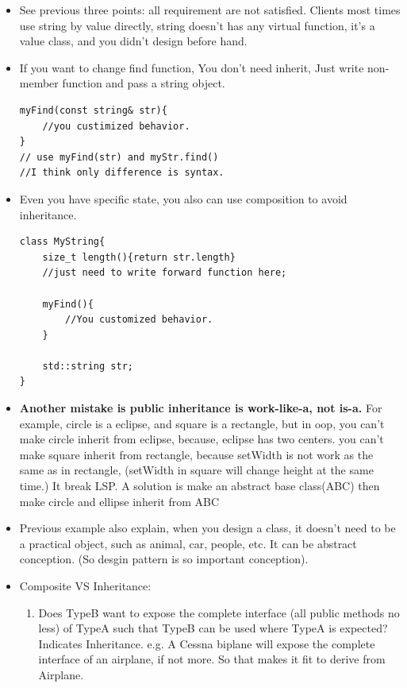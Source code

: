 \documentclass[a4paper,11pt,twoside]{book}
\begin{document}
\begin{itemize}
	\item See previous three points: all requirement are not satisfied. Clients most times use string by value directly, string doesn't has any virtual function, it's a value class, and you didn't design before hand.
	
\item If you want to change find function, You don't need inherit,  Just write non-member function and pass a string object.
\begin{lstlisting}[numbers=none]
myFind(const string& str){
	//you custimized behavior.
}
// use myFind(str) and myStr.find()
//I think only difference is syntax.
\end{lstlisting}
	
\item Even you have specific state, you also can use composition to avoid inheritance.
\begin{lstlisting}[numbers=none]
class MyString{
	size_t length(){return str.length}
	//just need to write forward function here;
	
	myFind(){
		//You customized behavior.
	}
	
	std::string str;
}
	\end{lstlisting}
	
	\item \textbf{Another mistake is public inheritance is work-like-a, not is-a.} For example, circle is a eclipse, and square is a rectangle, but in oop, you can't make circle inherit from eclipse, because, eclipse has two centers.  you can't make square inherit from rectangle, because setWidth is not work as the same as in rectangle, (setWidth in square will change height at the same time.) It break LSP.  A solution is make an abstract base class(ABC) then make circle and ellipse inherit from ABC
	
	
	\item Previous example also explain, when you design a class, it doesn't need to be a practical object, such as animal, car, people, etc.  It can be abstract conception.  (So desgin pattern is so important conception).
	
	\item Composite VS Inheritance:
	\begin{enumerate}
		\item Does TypeB want to expose the complete interface (all public methods no less) of TypeA such that TypeB can be used where TypeA is expected? Indicates Inheritance. e.g. A Cessna biplane will expose the complete interface of an airplane, if not more. So that makes it fit to derive from Airplane.
		

\end{enumerate}
\end{itemize}
\end{document}
